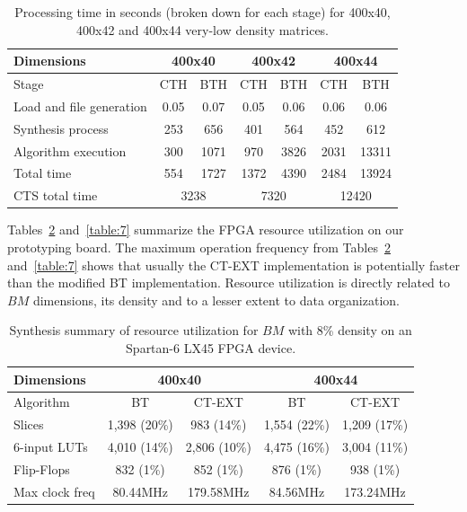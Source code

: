 \documentclass[authoryear,preprint,review,12pt]{elsarticle}
\begin{document}
\begin{table}[htb]
\caption{Processing time in seconds (broken down for each stage) for 
400x40, 400x42 and 400x44 very-low density matrices.} \label{table:8}
\begin{center}
    \begin{tabular}{lcccccc}   \hline
    	   Dimensions                & \multicolumn{2}{c}{400x40} & \multicolumn{2}{c}{400x42} 
    	                             & \multicolumn{2}{c}{400x44} \\ \hline
    	    	Stage	        			& CTH & BTH	& CTH & BTH & CTH & BTH \\ \hline
    	    Load and file generation & 0.05& 0.07& 0.05& 0.06& 0.06& 0.06\\
    	    Synthesis process        & 253 & 656 & 401 & 564 & 452 & 612\\
    	    Algorithm execution      & 300 & 1071& 970 & 3826& 2031& 13311\\ \hline
    	    Total time               & 554 & 1727& 1372& 4390& 2484& 13924\\ \hline
    	    CTS total time               & \multicolumn{2}{c}{3238} & \multicolumn{2}{c}{7320} 
    	    								& \multicolumn{2}{c}{12420}\\ \hline
    	    
    \end{tabular}
\end{center}
\end{table}

Tables~\ref{table:6} and~\ref{table:7} summarize the FPGA resource utilization on our prototyping board. 
The maximum operation frequency from Tables~\ref{table:6} and~\ref{table:7} shows that usually the CT-EXT 
implementation is potentially faster than the modified BT implementation. Resource utilization is 
directly related to $BM$ dimensions, its density and to a lesser extent to data organization.

\begin{table}[htb]
\caption{Synthesis summary of resource utilization for $BM$ with 8\% density on an Spartan-6 LX45 
FPGA device.} \label{table:6}
\begin{center}
    \begin{tabular}{lcccc}   \hline
    	    Dimensions & \multicolumn{2}{c}{400x40} & \multicolumn{2}{c}{400x44} \\ \hline
    	    Algorithm & BT & CT-EXT & BT & CT-EXT \\ \hline
        Slices & 1,398 (20\%) & 983 (14\%) & 1,554 (22\%) & 1,209 (17\%)  \\
        6-input LUTs & 4,010 (14\%) & 2,806 (10\%)& 4,475 (16\%)  & 3,004 (11\%)\\
        Flip-Flops & 832 (1\%) & 852 (1\%) & 876 (1\%) & 938 (1\%)\\
        Max clock freq & 80.44MHz & 179.58MHz & 84.56MHz & 173.24MHz\\ \hline
    \end{tabular}
\end{center}
\end{table}
\end{document}
